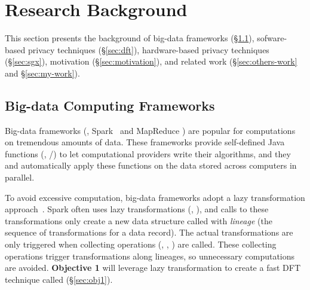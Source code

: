 \vspace{-.15in}\section{Research Background} 
\label{sec:background}\vspace{-.075in}


This section presents the background of big-data 
frameworks (\S\ref{sec:bigdata}), sofware-based privacy techniques  
(\S\ref{sec:dft}), hardware-based privacy techniques (\S\ref{sec:sgx}), 
motivation (\S\ref{sec:motivation}), and related work 
(\S\ref{sec:others-work} and \S\ref{sec:my-work}).


\vspace{-.15in}\subsection{Big-data Computing Frameworks} 
\label{sec:bigdata}\vspace{-.075in}

Big-data frameworks (\eg, Spark~\cite{nsdi12:spark} and MapReduce 
\cite{mapreduce}) are popular for computations on tremendous amounts of data. 
These frameworks provide self-defined Java functions (\eg, 
/) to let computational providers write their 
algorithms, and they and automatically apply these functions on the data stored 
across computers in parallel.



To avoid excessive computation, big-data frameworks adopt a lazy 
transformation approach~\cite{pig:vldb08,nsdi12:spark,osdi08:dryad}. Spark 
often uses lazy transformations (\eg, ), and calls to 
these transformations only create a new data structure called  with 
\emph{lineage} (the sequence of transformations for a data record).
The actual transformations are only triggered when collecting 
operations (\eg, , ) are called. These collecting 
operations trigger transformations along lineages, so unnecessary 
computations are avoided. \textbf{Objective 1} will leverage lazy 
transformation to create a fast DFT technique called \lazyp (\S\ref{sec:obj1}).

